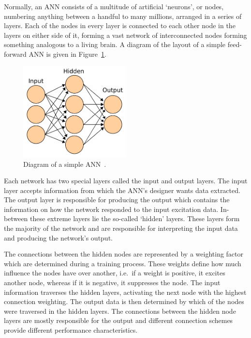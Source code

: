 Normally, an ANN consists of a multitude of artificial `neurons', or nodes, numbering anything between a handful to many millions, arranged in a series of layers. Each of the nodes in every layer is connected to each other node in the layers on either side of it, forming a vast network of interconnected nodes forming something analogous to a living brain. A diagram of the layout of a simple feed-forward ANN is given in Figure~\ref{fig:chap2-ann-layout}.

\begin{figure}
  \centering
  \includegraphics[width=0.5\textwidth]{figures/chapter2/ANN_diagram}
  \caption[Diagram of a simple ANN.]{Diagram of a simple ANN~\citep{ann-wiki-pic}.}
\label{fig:chap2-ann-layout}
\end{figure}

Each network has two special layers called the input and output layers. The input layer accepts information from which the ANN's designer wants data extracted. The output layer is responsible for producing the output which contains the information on how the network responded to the input excitation data. In-between these extreme layers lie the so-called `hidden' layers. These layers form the majority of the network and are responsible for interpreting the input data and producing the network's output. 

The connections between the hidden nodes are represented by a weighting factor which are determined during a training process. These weights define how much influence the nodes have over another, i.e.\ if a weight is positive, it excites another node, whereas if it is negative, it suppresses the node. The input information traverses the hidden layers, activating the next node with the highest connection weighting. The output data is then determined by which of the nodes were traversed in the hidden layers. The connections between the hidden node layers are mostly responsible for the output and different connection schemes provide different performance characteristics. 

